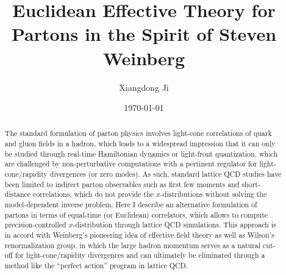 \documentclass[prd,aps,twocolumn,preprintnumbers,showpacs,nofootinbib,superscriptaddress,notitlepage]{revtex4-1}
\begin{document}
\title{Euclidean Effective Theory for Partons in the Spirit of Steven Weinberg}

\author{Xiangdong Ji}


\date{\today{}}
\begin{abstract}

The standard formulation of parton physics involves light-cone correlations of quark and gluon fields in a hadron, which leads to a widespread impression that it can only be studied through real-time Hamiltonian dynamics or light-front quantization, which are 
challenged by non-perturbative computations with a pertinent regulator for light-cone/rapidity divergences (or zero modes). As such, standard lattice QCD studies have been limited to indirect 
parton observables such as first few moments and short-distance correlations, which do not provide the $x$-distributions without solving the model-dependent inverse problem. 
Here I describe an alternative formulation of partons in terms of equal-time (or Euclidean) correlators, which allows to compute precision-controlled $x$-distribution through lattice QCD simulations. This approach is in accord with Weinberg's pioneering idea of effective field theory as well as Wilson's renormalization group, in which the large hadron momentum serves as a natural cut-off for light-cone/rapidity divergences and can ultimately be eliminated through a method like the ``perfect action'' program in lattice QCD.  

\end{abstract}
\maketitle
\end{document}
